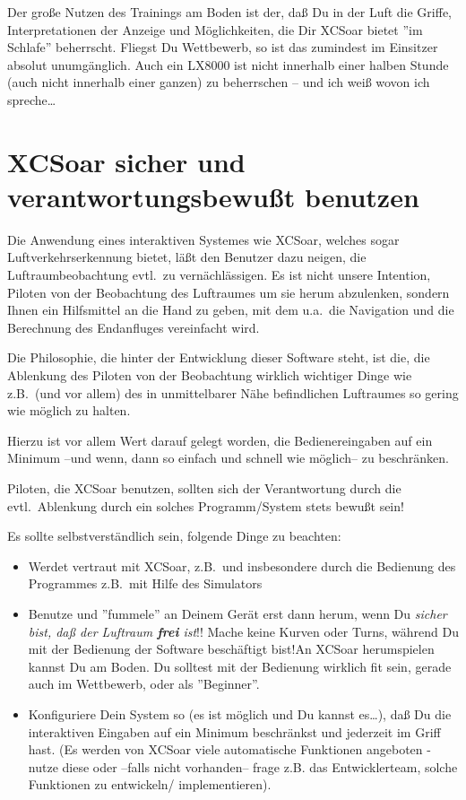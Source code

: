 Der große Nutzen des Trainings am Boden ist der, daß Du in der Luft die Griffe, Interpretationen der Anzeige und Möglichkeiten, 
die Dir \textsf{XCSoar} bietet ''im Schlafe'' beherrscht. Fliegst Du Wettbewerb, so ist das zumindest im Einsitzer absolut unumgänglich.
Auch ein LX8000 ist nicht innerhalb einer halben Stunde (auch nicht innerhalb einer ganzen) zu beherrschen -- und ich weiß wovon ich spreche\dots


\section{\textsf{XCSoar} sicher und verantwortungsbewußt benutzen}
Die Anwendung eines interaktiven Systemes wie  \textsf{XCSoar}, welches sogar Luftverkehrserkennung bietet, läßt den Benutzer dazu neigen, die Luftraumbeobachtung evtl.\ zu vernächlässigen. 
Es ist nicht unsere Intention, Piloten von der Beobachtung des Luftraumes um sie herum abzulenken,  sondern Ihnen  ein Hilfsmittel an die Hand zu geben,
mit dem u.a.\ die Navigation  und die Berechnung  des Endanfluges vereinfacht wird.

Die Philosophie, die hinter der Entwicklung dieser Software steht, ist die, die Ablenkung des Piloten von der Beobachtung wirklich wichtiger Dinge
wie z.B.\ (und vor allem) des in unmittelbarer Nähe befindlichen Luftraumes so gering wie möglich zu halten.

Hierzu ist vor allem Wert darauf gelegt worden, die Bedienereingaben auf ein Minimum --und wenn, dann so einfach und 
schnell wie möglich-- zu beschränken. 
 
Piloten, die  \textsf{XCSoar} benutzen, sollten sich der Verantwortung durch die evtl.\ Ablenkung durch ein solches Programm/System stets bewußt sein!

Es sollte selbstverständlich sein, folgende Dinge zu beachten:
\begin{itemize}
\item Werdet vertraut mit \textsf{XCSoar}, z.B.\ und insbesondere durch die Bedienung des Programmes z.B.\ mit Hilfe des Simulators
\item Benutze und ''fummele'' an Deinem Gerät erst dann herum, wenn Du {\sl sicher bist, daß der Luftraum {\bf frei} ist}!! 
Mache keine Kurven oder Turns, während Du mit der Bedienung der Software beschäftigt bist!An \textsf{XCSoar} herumspielen kannst Du am Boden. 
Du solltest mit der Bedienung wirklich fit sein, gerade auch im Wettbewerb, oder als ''Beginner''.
\item Konfiguriere Dein System so (es ist möglich und Du kannst es\dots), daß Du die interaktiven Eingaben auf ein Minimum beschränkst und 
jederzeit im Griff hast. (Es werden von \textsf{XCSoar} viele automatische Funktionen angeboten - nutze diese oder --falls nicht vorhanden-- 
frage z.B. das Entwicklerteam,  solche Funktionen zu entwickeln/ implementieren).   
\end{itemize}
